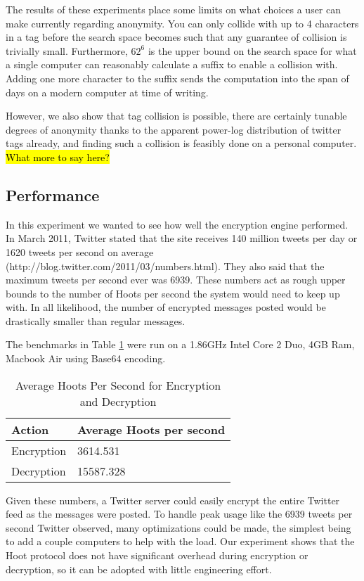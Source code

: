 The results of these experiments place some limits on what choices a user can make currently regarding anonymity. You can only collide with up to 4 characters in a tag before the search space becomes such that any guarantee of collision is trivially small. Furthermore, $62^6$ is the upper bound on the search space for what a single computer can reasonably calculate a suffix to enable a collision with. Adding one more character to the suffix sends the computation into the span of days on a modern computer at time of writing.

However, we also show that tag collision is possible, there are certainly tunable degrees of anonymity thanks to the apparent power-log distribution of twitter tags already, and finding such a collision is feasibly done on a personal computer. \hl{What more to say here?}

\subsection{Performance}

In this experiment we wanted to see how well the encryption engine performed. In March 2011, Twitter stated that the site receives 140 million tweets per day or 1620 tweets per second on average (http://blog.twitter.com/2011/03/numbers.html). They also said that the maximum tweets per second ever was 6939. These numbers act as rough upper bounds to the number of Hoots per second the system would need to keep up with. In all likelihood, the number of encrypted messages posted would be drastically smaller than regular messages.

The benchmarks in Table \ref{tab:hps} were run on a 1.86GHz Intel Core 2 Duo, 4GB Ram, Macbook Air using Base64 encoding.


\begin{table}
\caption{Average Hoots Per Second for Encryption and Decryption
\label{tab:hps}
}
\begin{center}
    \begin{tabular}{ l  l }
	\hline
	Action & Average Hoots per second \\ \hline
	Encryption & 3614.531 \\
	Decryption & 15587.328 \\ \hline
    \end{tabular}
\end{center}
\end{table}

Given these numbers, a Twitter server could easily encrypt the entire Twitter feed as the messages were posted. To handle peak usage like the 6939 tweets per second Twitter observed, many optimizations could be made, the simplest being to add a couple computers to help with the load. Our experiment shows that the Hoot protocol does not have significant overhead during encryption or decryption, so it can be adopted with little engineering effort.

